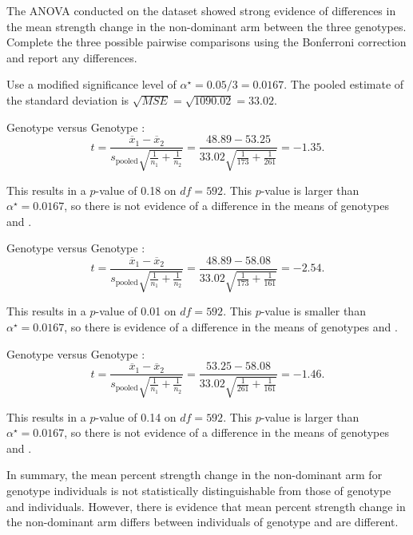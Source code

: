 \begin{examplewrap}
\begin{nexample}{The ANOVA conducted on the  dataset showed strong evidence of differences in the mean strength change in the non-dominant arm between the three genotypes. Complete the three possible pairwise comparisons using the Bonferroni correction and report any differences.}

Use a modified significance level of $\alpha^\star = 0.05/3 = 0.0167$. The pooled estimate of the standard deviation is $\sqrt{MSE} = \sqrt{1090.02} = 33.02$.

Genotype  versus Genotype : 
\[
t = \frac{\overline{x}_1 - \overline{x}_2}{s_{\text{pooled}}\sqrt{\frac{1}{n_1} + \frac{1}{n_2}}} 
 = \dfrac{48.89 - 53.25}{33.02 \sqrt{\frac{1}{173} + \frac{1}{261}}} = -1.35.\]
 
This results in a $p$-value of 0.18 on $df =592$. This $p$-value is larger than $\alpha^\star = 0.0167$, so there is not evidence of a difference in the means of genotypes  and .

Genotype  versus Genotype : 
 \[
 t = \frac{\overline{x}_1 - \overline{x}_2}{s_{\text{pooled}}\sqrt{\frac{1}{n_1} + \frac{1}{n_2}}}
 = \dfrac{48.89 - 58.08}{33.02 \sqrt{\frac{1}{173} + \frac{1}{161}}} = -2.54.\]

This results in a $p$-value of 0.01 on $df =592$. This $p$-value is smaller than $\alpha^\star = 0.0167$, so there is evidence of a difference in the means of genotypes  and .
 
Genotype  versus Genotype :  
 \[
 t = \frac{\overline{x}_1 - \overline{x}_2}{s_{\text{pooled}}\sqrt{\frac{1}{n_1} + \frac{1}{n_2}}}
 = \dfrac{53.25 - 58.08}{33.02 \sqrt{\frac{1}{261} + \frac{1}{161}}} = -1.46.\]

This results in a $p$-value of 0.14 on $df =592$. This $p$-value is larger than $\alpha^\star = 0.0167$, so there is not evidence of a difference in the means of genotypes  and .

In summary, the mean percent strength change in the non-dominant arm for genotype  individuals is not statistically distinguishable from those of genotype  and  individuals. However, there is evidence that mean percent strength change in the non-dominant arm differs between individuals of genotype  and  are different. 
\end{nexample}
\end{examplewrap}

